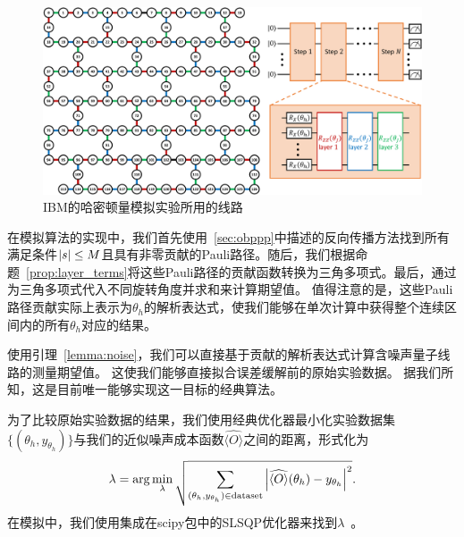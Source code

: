 \begin{figure}[htbp]
    \centering
    \includegraphics[width=\textwidth]{figures/IBM_Ansatz.pdf}
    \caption{IBM的哈密顿量模拟实验所用的线路}\label{fig:IBM_Ansatz}
\end{figure}

在模拟算法的实现中，我们首先使用~\ref{sec:obppp}中描述的反向传播方法找到所有满足条件$\abs{s}\leq M$且具有非零贡献的Pauli路径。随后，我们根据命题~\ref{prop:layer_terms}将这些Pauli路径的贡献函数转换为三角多项式。最后，通过为三角多项式代入不同旋转角度并求和来计算期望值。
值得注意的是，这些Pauli路径贡献实际上表示为$\theta_h$的解析表达式，使我们能够在单次计算中获得整个连续区间内的所有$\theta_h$对应的结果。

使用引理~\ref{lemma:noise}，我们可以直接基于贡献的解析表达式计算含噪声量子线路的测量期望值。
这使我们能够直接拟合误差缓解前的原始实验数据。
据我们所知，这是目前唯一能够实现这一目标的经典算法。

为了比较原始实验数据的结果，我们使用经典优化器最小化实验数据集$\{(\theta_h,y_{\theta_h})\}$与我们的近似噪声成本函数$\widehat{\langle O \rangle}$之间的距离，形式化为
\begin{equation}\label{ap:eq:minimal_lambda}
  \lambda=\arg\min_\lambda  \sqrt{\sum_{(\theta_h,y_{\theta_h})\in \mathrm{data set}}\abs{\widehat{\langle O \rangle}(\theta_h)-y_{\theta_h}}^2}.
\end{equation}
在模拟中，我们使用集成在scipy包中的SLSQP优化器来找到$\lambda$~\cite{2020SciPy-NMeth}。


